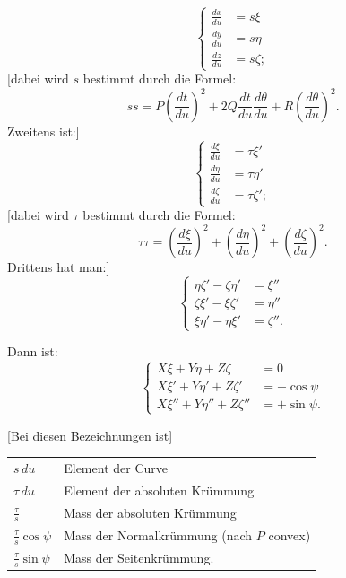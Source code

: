 %
\begin{equation}\tag*{[4]}
\left\{\begin{aligned}
\frac{dx}{du}&=s\xi\\
\frac{dy}{du}&=s\eta\\
\frac{dz}{du}&=s\zeta;
\end{aligned}\right.
\end{equation}
[dabei wird $s$ bestimmt durch die Formel:
\begin{equation}\tag*{[5]}
ss=P\left(\frac{dt}{du}\right)^2+2Q\frac{dt}{du}\frac{d\theta}{du}+R\left(\frac{d\theta}{du}\right)^2.
\end{equation}
Zweitens ist:]
\begin{equation}\tag*{[6]}
\left\{\begin{aligned}
\frac{d\xi}{du}&=\tau\xi'\\
\frac{d\eta}{du}&=\tau\eta'\\
\frac{d\zeta}{du}&=\tau\zeta';
\end{aligned}\right.
\end{equation}
[dabei wird $\tau$ bestimmt durch die Formel:
\begin{equation}\tag*{[7]}
\tau\tau=\left(\frac{d\xi}{du}\right)^2+\left(\frac{d\eta}{du}\right)^2+\left(\frac{d\zeta}{du}\right)^2.
\end{equation}
Drittens hat man:]
\begin{equation}\tag*{[8]}
\left\{\begin{aligned}
\eta\zeta'-\zeta\eta'&=\xi''\\
\zeta\xi'-\xi\zeta'&=\eta''\\
\xi\eta'-\eta\xi'&=\zeta''.
\end{aligned}\right.
\end{equation}
\par Dann ist:
\begin{equation}\tag*{[9]}
\left\{\begin{aligned}
X\xi+Y\eta+Z\zeta&=0\\
X\xi'+Y\eta'+Z\zeta'&=-\cos\psi\\
X\xi''+Y\eta''+Z\zeta''&=+\sin\psi.
\end{aligned}\right.
\end{equation}

[Bei diesen Bezeichnungen ist]
\begin{center}
\begin{tabular}{ll}
$s\,du$&Element der Curve\\[3pt]
$\tau\,du$&Element der absoluten Krümmung\\[3pt]
$\frac{\tau}{s}$&Mass der absoluten Krümmung\\[3pt]
$\frac{\tau}{s}\cos\psi$&Mass der Normalkrümmung (nach $P$ convex)\\[3pt]
$\frac{\tau}{s}\sin\psi$&Mass der Seitenkrümmung.
\end{tabular}
\par\medskip

\end{center}
